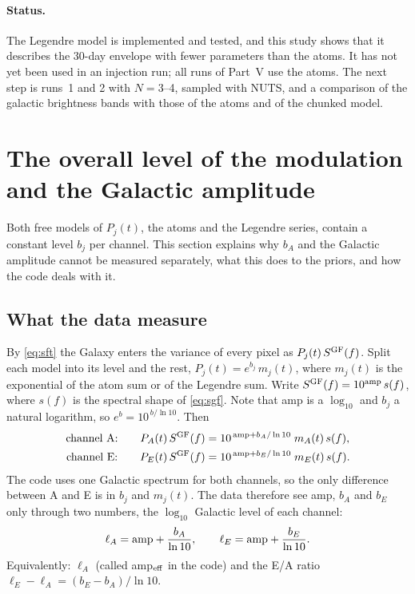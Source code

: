 \documentclass[11pt,a4paper]{article}
\begin{document}
\paragraph{Status.} The Legendre model is implemented and tested, and this study shows
that it describes the 30-day envelope with fewer parameters than the atoms. It has
not yet been used in an injection run; all runs of Part~V use the atoms. The next
step is runs~1 and 2 with $N=3$--4, sampled with NUTS, and a comparison of the
galactic brightness bands with those of the atoms and of the chunked model.

\section{The overall level of the modulation and the Galactic amplitude}\label{sec:level}

Both free models of $P_j(t)$, the atoms and the Legendre series, contain a constant
level $b_j$ per channel. This section explains why $b_A$ and the Galactic amplitude
cannot be measured separately, what this does to the priors, and how the code deals
with it.

\subsection{What the data measure}

By \cref{eq:sft} the Galaxy enters the variance of every pixel as
$P_j(t)\,S^{\rm GF}(f)$. Split each model into its level and the rest,
$P_j(t)=e^{b_j}\,m_j(t)$, where $m_j(t)$ is the exponential of the atom sum or of the
Legendre sum. Write $S^{\rm GF}(f)=10^{\rm amp}\,s(f)$, where $s(f)$ is the spectral
shape of \cref{eq:sgf}. Note that amp is a $\log_{10}$ and $b_j$ a natural
logarithm, so $e^{b}=10^{\,b/\ln10}$. Then
\begin{align}
  \text{channel A:}\qquad P_A(t)\,S^{\rm GF}(f) &= 10^{\,{\rm amp}+b_A/\ln10}\;m_A(t)\,s(f),\\
  \text{channel E:}\qquad P_E(t)\,S^{\rm GF}(f) &= 10^{\,{\rm amp}+b_E/\ln10}\;m_E(t)\,s(f).
\end{align}
The code uses one Galactic spectrum for both channels, so the only difference between
A and E is in $b_j$ and $m_j(t)$. The data therefore see amp, $b_A$ and $b_E$ only
through two numbers, the $\log_{10}$ Galactic level of each channel:
\begin{equation}
  \ell_A = {\rm amp} + \frac{b_A}{\ln10},\qquad
  \ell_E = {\rm amp} + \frac{b_E}{\ln10}.
  \label{eq:levels}
\end{equation}
Equivalently: $\ell_A$ (called amp$_{\rm eff}$ in the code) and the E/A ratio
$\ell_E-\ell_A=(b_E-b_A)/\ln10$.
\end{document}
